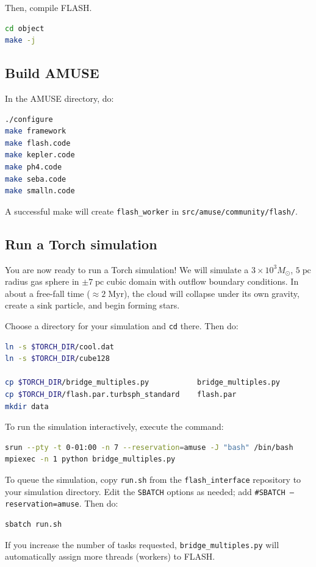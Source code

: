 \documentclass[10pt]{article}
\newcommand*{\mt}{\mathrm}
\newcommand*{\unit}[1]{\;\mt{#1}}  %
\newcommand*{\Msun}{M_\odot}
\begin{document}
Then, compile FLASH.
\begin{lstlisting}[language=bash]
cd object
make -j
\end{lstlisting}

\subsection{Build AMUSE}

In the AMUSE directory, do:
\begin{lstlisting}[language=bash]
./configure
make framework
make flash.code
make kepler.code
make ph4.code
make seba.code
make smalln.code
\end{lstlisting}
A successful make will create \texttt{flash\_worker} in
\texttt{src/amuse/community/flash/}.

\subsection{Run a Torch simulation}

You are now ready to run a Torch simulation!  We will simulate a
$3 \times 10^3 \Msun$, $5 \unit{pc}$ radius gas sphere in $\pm 7 \unit{pc}$
cubic domain with outflow boundary conditions.
In about a free-fall time ($\approx 2 \unit{Myr}$), the cloud will collapse
under its own gravity, create a sink particle, and begin forming stars.

Choose a directory for your simulation and \texttt{cd} there.  Then do:
\begin{lstlisting}[language=bash]
ln -s $TORCH_DIR/cool.dat
ln -s $TORCH_DIR/cube128

cp $TORCH_DIR/bridge_multiples.py           bridge_multiples.py
cp $TORCH_DIR/flash.par.turbsph_standard    flash.par
mkdir data
\end{lstlisting}

To run the simulation interactively, execute the command:
\begin{lstlisting}[language=bash]
srun --pty -t 0-01:00 -n 7 --reservation=amuse -J "bash" /bin/bash
mpiexec -n 1 python bridge_multiples.py
\end{lstlisting}

To queue the simulation, copy \texttt{run.sh} from the
\texttt{flash\_interface} repository to your simulation directory.
Edit the \texttt{SBATCH} options as needed;
add \texttt{\#SBATCH --reservation=amuse}.
Then do:
\begin{lstlisting}[language=bash]
sbatch run.sh
\end{lstlisting}
If you increase the number of tasks requested, \texttt{bridge\_multiples.py}
will automatically assign more threads (workers) to FLASH.
\end{document}

